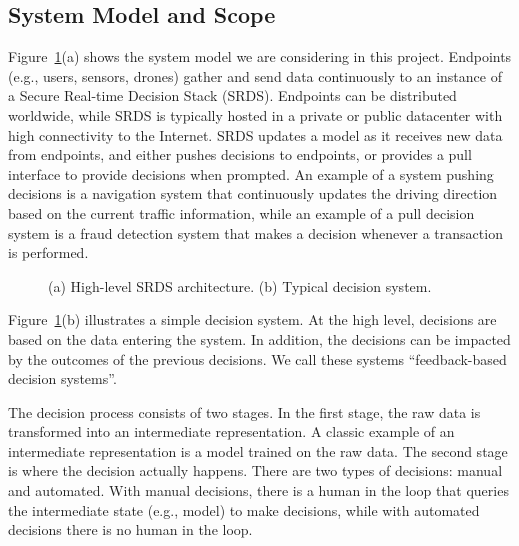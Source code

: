 \subsection{System Model and Scope}


Figure~\ref{figure:model-and-decision}(a) shows the system model we are considering in this project. Endpoints (e.g., users, sensors, drones) gather and send data continuously to an instance of a Secure Real-time Decision Stack (SRDS). Endpoints can be distributed worldwide, while SRDS is typically hosted in a private or public datacenter with high connectivity to the Internet. SRDS updates a model as it receives new data from endpoints, and either pushes decisions to endpoints, or provides a pull interface to provide decisions when prompted. An example of a system pushing decisions is a navigation system that continuously updates the driving direction based on the current traffic information, while an example of a pull decision system  is a fraud detection system that makes a decision whenever a transaction is performed.

\0
\begin{figure}[h]
 \caption{\small{(a) High-level SRDS architecture. (b) Typical decision system.}}
  \label{figure:model-and-decision}
\end{figure}

Figure~\ref{figure:model-and-decision}(b) illustrates a simple decision system. At the high level, decisions are based on the data entering the system. In addition, the decisions can be impacted by the outcomes of the previous decisions. We call these systems ``feedback-based decision systems''.

The decision process consists of two stages. In the first stage, the raw data is transformed into an intermediate representation. A classic example of an intermediate representation is a model trained on the raw data. The second stage is where the decision actually happens. There are two types of decisions: manual and automated. With manual decisions, there is a human in the loop that queries the intermediate state (e.g., model) to make decisions, while with automated decisions there is no human in the loop.


